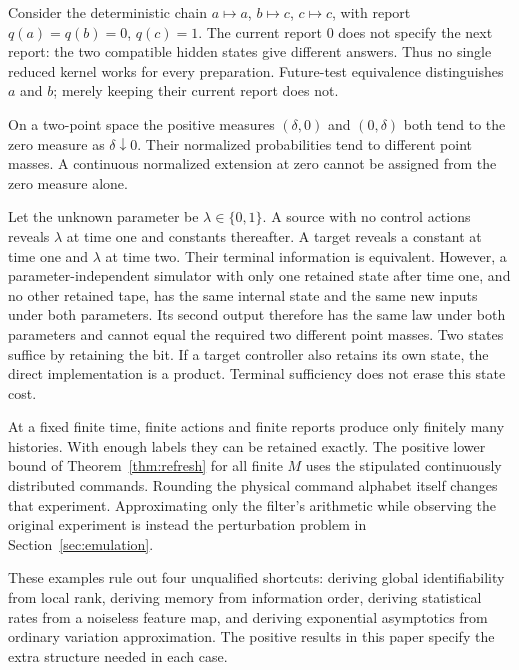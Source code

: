 \begin{example}
Consider the deterministic chain $a\mapsto a$, $b\mapsto c$, $c\mapsto c$,
with report $q(a)=q(b)=0$, $q(c)=1$. The current report $0$ does not specify
the next report: the two compatible hidden states give different answers.
Thus no single reduced kernel works for every preparation. Future-test
equivalence distinguishes $a$ and $b$; merely keeping their current report
does not.
\end{example}

\begin{example}
On a two-point space the positive measures $(\delta,0)$ and $(0,\delta)$
both tend to the zero measure as $\delta\downarrow0$. Their normalized
probabilities tend to different point masses. A continuous normalized
extension at zero cannot be assigned from the zero measure alone.
\end{example}

\begin{example}
Let the unknown parameter be $\lambda\in\{0,1\}$. A source with no
control actions reveals $\lambda$ at time one and constants thereafter.
A target reveals a constant at time one and $\lambda$ at time two.
Their terminal information is equivalent. However, a parameter-independent
simulator with only one retained state after time one, and no other retained
tape, has the same internal state and the same new inputs under both
parameters. Its second output therefore has the same law under both
parameters and cannot equal the required two different point masses.
Two states suffice by retaining the bit. If a target controller also
retains its own state, the direct implementation is a product. Terminal
sufficiency does not erase this state cost.
\end{example}

\begin{example}
At a fixed finite time, finite actions and finite reports produce only
finitely many histories. With enough labels they can be retained exactly.
The positive lower bound of Theorem~\ref{thm:refresh} for all finite $M$
uses the stipulated continuously distributed commands. Rounding the
physical command alphabet itself changes that experiment. Approximating
only the filter's arithmetic while observing the original experiment is
instead the perturbation problem in Section~\ref{sec:emulation}.
\end{example}

These examples rule out four unqualified shortcuts: deriving global
identifiability from local rank, deriving memory from information order,
deriving statistical rates from a noiseless feature map, and deriving
exponential asymptotics from ordinary variation approximation. The positive
results in this paper specify the extra structure needed in each case.
